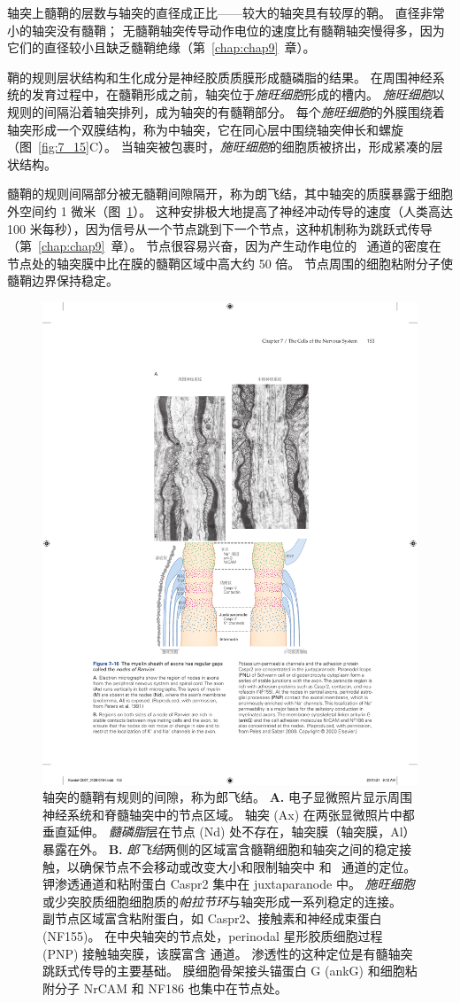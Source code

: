 轴突上髓鞘的层数与轴突的直径成正比——较大的轴突具有较厚的鞘。
直径非常小的轴突没有髓鞘；
无髓鞘轴突传导动作电位的速度比有髓鞘轴突慢得多，因为它们的直径较小且缺乏髓鞘绝缘（第~\ref{chap:chap9}~章）。


鞘的规则层状结构和生化成分是神经胶质质膜形成髓磷脂的结果。
在周围神经系统的发育过程中，在髓鞘形成之前，轴突位于\textit{施旺细胞}形成的槽内。
\textit{施旺细胞}以规则的间隔沿着轴突排列，成为轴突的有髓鞘部分。
每个\textit{施旺细胞}的外膜围绕着轴突形成一个双膜结构，称为中轴突，它在同心层中围绕轴突伸长和螺旋（图~\ref{fig:7_15}C）。
当轴突被包裹时，\textit{施旺细胞}的细胞质被挤出，形成紧凑的层状结构。


髓鞘的规则间隔部分被无髓鞘间隙隔开，称为朗飞结，其中轴突的质膜暴露于细胞外空间约 1 微米（图~\ref{fig:7_16}）。 
这种安排极大地提高了神经冲动传导的速度（人类高达 100 米每秒），因为信号从一个节点跳到下一个节点，这种机制称为跳跃式传导（第~\ref{chap:chap9}~章）。 
节点很容易兴奋，因为产生动作电位的~ 通道的密度在节点处的轴突膜中比在膜的髓鞘区域中高大约 50 倍。
节点周围的细胞粘附分子使髓鞘边界保持稳定。


\begin{figure}[htbp]
	\centering
	\includegraphics[width=0.6\linewidth]{chap07/fig_7_16}
	\caption{轴突的髓鞘有规则的间隙，称为郎飞结。
		\textbf{A.} 电子显微照片显示周围神经系统和脊髓轴突中的节点区域。
		轴突 (Ax) 在两张显微照片中都垂直延伸。
		\textit{髓磷脂}层在节点 (Nd) 处不存在，轴突膜（轴突膜，Al）暴露在外\cite{peters1991neuropil}。
		\textbf{B.} \textit{郎飞结}两侧的区域富含髓鞘细胞和轴突之间的稳定接触，以确保节点不会移动或改变大小和限制轴突中  和~ 通道的定位。
		钾渗透通道和粘附蛋白 Caspr2 集中在 juxtaparanode 中。
		\textit{施旺细胞}或少突胶质细胞细胞质的\textit{帕拉节环}与轴突形成一系列稳定的连接。
		副节点区域富含粘附蛋白，如 Caspr2、接触素和神经成束蛋白 (NF155)。
		在中央轴突的节点处，perinodal 星形胶质细胞过程 (PNP) 接触轴突膜，该膜富含  通道。
		 渗透性的这种定位是有髓轴突跳跃式传导的主要基础。
		膜细胞骨架接头锚蛋白 G (ankG) 和细胞粘附分子 NrCAM 和 NF186 也集中在节点处\cite{peles2000molecular}。}
	\label{fig:7_16}
\end{figure}


